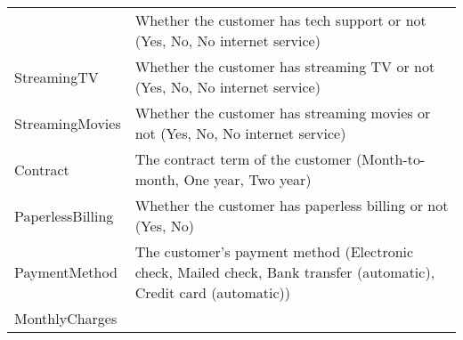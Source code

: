 \begin{longtable}[]{@{}ll@{}}
\begin{minipage}[t]{0.52\columnwidth}
\end{minipage} & \begin{minipage}[t]{0.43\columnwidth}\raggedright
Whether the customer has tech support or not (Yes, No, No internet
service)\strut
\end{minipage}\tabularnewline
\begin{minipage}[t]{0.52\columnwidth}\raggedright
StreamingTV\strut
\end{minipage} & \begin{minipage}[t]{0.43\columnwidth}\raggedright
Whether the customer has streaming TV or not (Yes, No, No internet
service)\strut
\end{minipage}\tabularnewline
\begin{minipage}[t]{0.52\columnwidth}\raggedright
StreamingMovies\strut
\end{minipage} & \begin{minipage}[t]{0.43\columnwidth}\raggedright
Whether the customer has streaming movies or not (Yes, No, No internet
service)\strut
\end{minipage}\tabularnewline
\begin{minipage}[t]{0.52\columnwidth}\raggedright
Contract\strut
\end{minipage} & \begin{minipage}[t]{0.43\columnwidth}\raggedright
The contract term of the customer (Month-to-month, One year, Two
year)\strut
\end{minipage}\tabularnewline
\begin{minipage}[t]{0.52\columnwidth}\raggedright
PaperlessBilling\strut
\end{minipage} & \begin{minipage}[t]{0.43\columnwidth}\raggedright
Whether the customer has paperless billing or not (Yes, No)\strut
\end{minipage}\tabularnewline
\begin{minipage}[t]{0.52\columnwidth}\raggedright
PaymentMethod\strut
\end{minipage} & \begin{minipage}[t]{0.43\columnwidth}\raggedright
The customer's payment method (Electronic check, Mailed check, Bank
transfer (automatic), Credit card (automatic))\strut
\end{minipage}\tabularnewline
\begin{minipage}[t]{0.52\columnwidth}\raggedright
MonthlyCharges\strut
\end{minipage} & \begin{minipage}[t]{0.43\columnwidth}\raggedright

\end{minipage}
\end{longtable}
